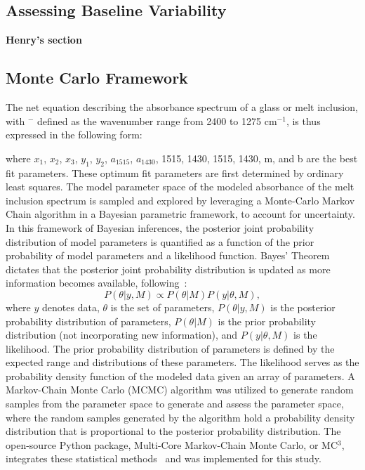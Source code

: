 \documentclass[draft]{agujournal2019}
\begin{document}
\subsection{Assessing Baseline Variability}
\textbf{Henry's section}

\subsection{Monte Carlo Framework}

The net equation describing the absorbance spectrum of a glass or melt inclusion, with \textupsilon$^-$ defined as the wavenumber range from 2400 to 1275 cm$^{-1}$, is thus expressed in the following form:

where $x_{1}$, $x_{2}$, $x_{3}$, $y_{1}$, $y_{2}$, $a_{1515}$, $a_{1430}$, 1515, 1430, 1515, 1430, m, and b are the best fit parameters. These optimum fit parameters are first determined by ordinary least squares. The model parameter space of the modeled absorbance of the melt inclusion spectrum is sampled and explored by leveraging a Monte-Carlo Markov Chain algorithm in a Bayesian parametric framework, to account for uncertainty. In this framework of Bayesian inferences, the posterior joint probability distribution of model parameters is quantified as a function of the prior probability of model parameters and a likelihood function. Bayes’ Theorem dictates that the posterior joint probability distribution is updated as more information becomes available, following~: 
\begin{equation}
P(\theta | y, M) \propto P(\theta | M) P(y | \theta, M),
\end{equation}
where $y$ denotes data, $\theta$ is the set of parameters, $P(\theta|y, M)$ is the posterior probability distribution of parameters, $P(\theta |M)$ is the prior probability distribution (not incorporating new information), and $P(y|\theta, M)$ is the likelihood. The prior probability distribution of parameters is defined by the expected range and distributions of these parameters. The likelihood serves as the probability density function of the modeled data given an array of parameters. A Markov-Chain Monte Carlo (MCMC) algorithm was utilized to generate random samples from the parameter space to generate and assess the parameter space, where the random samples generated by the algorithm hold a probability density distribution that is proportional to the posterior probability distribution. The open-source Python package, Multi-Core Markov-Chain Monte Carlo, or MC$^{3}$, integrates these statistical methods~\cite{Cubillosetal2017} and was implemented for this study.
\end{document}
